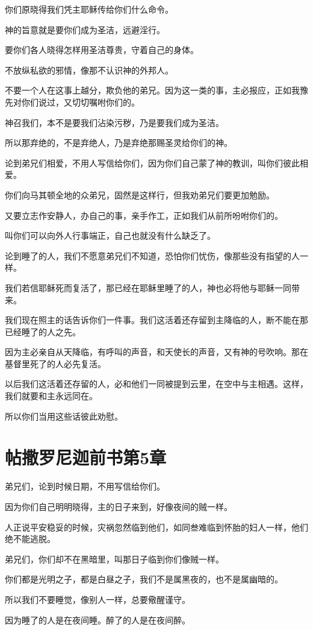 \documentclass[12pt,oneside]{book}
\begin{document}
你们原晓得我们凭主耶稣传给你们什么命令。

神的旨意就是要你们成为圣洁，远避淫行。

要你们各人晓得怎样用圣洁尊贵，守着自己的身体。

不放纵私欲的邪情，像那不认识神的外邦人。

不要一个人在这事上越分，欺负他的弟兄。因为这一类的事，主必报应，正如我豫先对你们说过，又切切嘱咐你们的。

神召我们，本不是要我们沾染污秽，乃是要我们成为圣洁。

所以那弃绝的，不是弃绝人，乃是弃绝那赐圣灵给你们的神。

论到弟兄们相爱，不用人写信给你们，因为你们自己蒙了神的教训，叫你们彼此相爱。

你们向马其顿全地的众弟兄，固然是这样行，但我劝弟兄们要更加勉励。

又要立志作安静人，办自己的事，亲手作工，正如我们从前所吩咐你们的。

叫你们可以向外人行事端正，自己也就没有什么缺乏了。

论到睡了的人，我们不愿意弟兄们不知道，恐怕你们忧伤，像那些没有指望的人一样。

我们若信耶稣死而复活了，那已经在耶稣里睡了的人，神也必将他与耶稣一同带来。

我们现在照主的话告诉你们一件事。我们这活着还存留到主降临的人，断不能在那已经睡了的人之先。

因为主必亲自从天降临，有呼叫的声音，和天使长的声音，又有神的号吹响。那在基督里死了的人必先复活。

以后我们这活着还存留的人，必和他们一同被提到云里，在空中与主相遇。这样，我们就要和主永远同在。

所以你们当用这些话彼此劝慰。

\chapter{帖撒罗尼迦前书第5章}
弟兄们，论到时候日期，不用写信给你们。

因为你们自己明明晓得，主的日子来到，好像夜间的贼一样。

人正说平安稳妥的时候，灾祸忽然临到他们，如同叁难临到怀胎的妇人一样，他们绝不能逃脱。

弟兄们，你们却不在黑暗里，叫那日子临到你们像贼一样。

你们都是光明之子，都是白昼之子，我们不是属黑夜的，也不是属幽暗的。

所以我们不要睡觉，像别人一样，总要儆醒谨守。

因为睡了的人是在夜间睡。醉了的人是在夜间醉。
\end{document}
